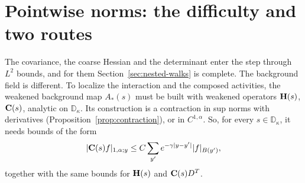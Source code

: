\section{Pointwise norms: the difficulty and two routes}\label{sec:pointwise-weak}

The covariance, the coarse Hessian and the determinant enter the step through $L^2$ bounds, and for them Section~\ref{sec:nested-walks} is complete. The background field is different. To localize the interaction and the composed activities, the weakened background map $A_*(s)$ must be built with weakened operators $\mathbf H(s)$, $\mathbf C(s)$, analytic on $\mathbb D_\kappa$. Its construction is a contraction in sup norms with derivatives (Proposition~\ref{prop:contraction}), or in $C^{1,\alpha}$. So, for every $s\in\mathbb D_\kappa$, it needs bounds of the form
\begin{equation}\label{eq:pointwise-needed}
|\mathbf C(s)f|_{1,\alpha;y}\le C\sum_{y'}e^{-\gamma|y-y'|}|f|_{B(y')},
\end{equation}
together with the same bounds for $\mathbf H(s)$ and $\mathbf C(s)D^T$.

